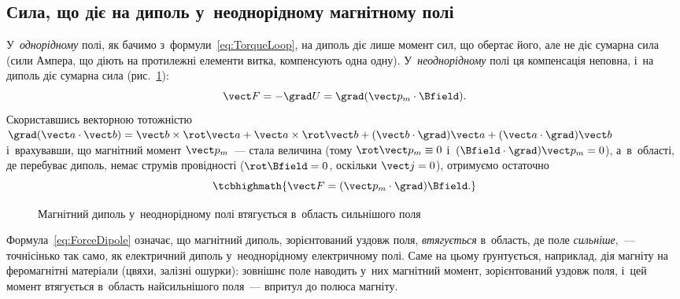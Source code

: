 \subsection*{Сила, що діє на диполь у~неоднорідному магнітному полі}


У~\emph{однорідному} полі, як бачимо з~формули~\eqref{eq:TorqueLoop}, на диполь діє лише
момент сил, що обертає його, але не діє сумарна сила (сили Ампера, що діють на протилежні
елементи витка, компенсують одна одну). У~\emph{неоднорідному} полі ця компенсація
неповна, і~на диполь діє сумарна сила (рис.~\ref{pic:ForceDipole}):
\begin{equation*}
	\vect F = -\grad U = \grad(\vect p_m\cdot\Bfield).
\end{equation*}
Скориставшись векторною тотожністю $\grad(\vect a\cdot\vect b) = \vect b\times\rot\vect a
	+ \vect a\times\rot\vect b + (\vect b\cdot\grad)\vect a + (\vect a\cdot\grad)\vect b$
і~врахувавши, що магнітний момент $\vect p_m$~--- стала величина (тому $\rot\vect p_m
	\equiv 0$ і~$(\Bfield\cdot\grad)\vect p_m = 0$), а~в~області, де перебуває диполь, немає
струмів провідності ($\rot\Bfield = 0$, оскільки $\vect j=0$), отримуємо остаточно
\begin{equation}\label{eq:ForceDipole}
	\tcbhighmath{
		\vect F = (\vect p_m\cdot\grad)\Bfield.
	}
\end{equation}

\begin{figure}\centering
	\caption{Магнітний диполь у~неоднорідному полі втягується в~область сильнішого
		поля\label{pic:ForceDipole}}
\end{figure}

Формула~\eqref{eq:ForceDipole} означає, що магнітний диполь, зорієнтований уздовж
поля, \emph{втягується} в~область, де поле \emph{сильніше},~--- точнісінько так само, як
електричний диполь у~неоднорідному електричному полі. Саме на цьому ґрунтується, наприклад,
дія магніту на феромагнітні матеріали (цвяхи, залізні ошурки): зовнішнє поле наводить у~них
магнітний момент, зорієнтований уздовж поля, і~цей момент втягується в~область
найсильнішого поля~--- впритул до полюса магніту.



